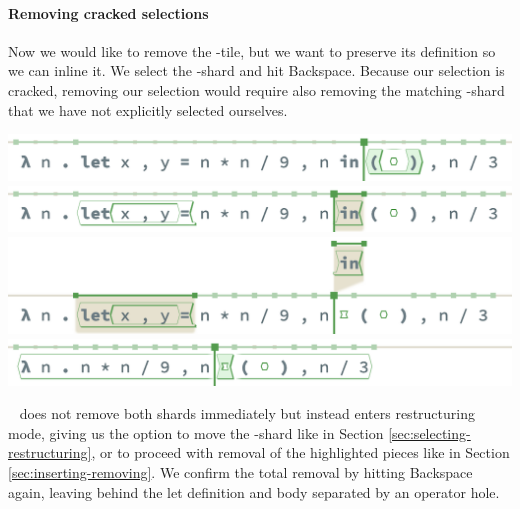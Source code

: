 \paragraph{Removing cracked selections}
Now we would like to remove the -tile,
but we want to preserve its definition so we
can inline it.
We select the -shard and hit Backspace.
Because our selection is cracked, removing
our selection would require also removing the
matching -shard that we have not
explicitly selected ourselves.
\begin{center}
  \includegraphics[width=0.9\columnwidth]{img/remove-cracked-0.png}
  \includegraphics[width=0.9\columnwidth]{img/remove-cracked-1.png}
  \includegraphics[width=0.9\columnwidth]{img/remove-cracked-2.png}
  \includegraphics[width=0.9\columnwidth]{img/remove-cracked-3.png}
\end{center}
\tylr~ does not remove both shards immediately but
instead enters restructuring mode, giving us the option
to move the -shard like in Section \ref{sec:selecting-restructuring},
or to proceed with removal of the highlighted pieces
like in Section \ref{sec:inserting-removing}.
We confirm the total removal by hitting Backspace again,
leaving behind the let definition and body
separated by an operator hole.


